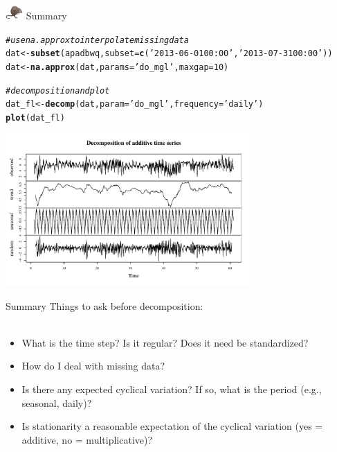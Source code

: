 \documentclass[xcolor=dvipsnames,serif]{beamer}\usepackage[]{graphicx}\usepackage[]{color}
\makeatletter
\newcommand{\hlnum}[1]{\textcolor[rgb]{0.686,0.059,0.569}{#1}}%
\newcommand{\hlstr}[1]{\textcolor[rgb]{0.192,0.494,0.8}{#1}}%
\newcommand{\hlcom}[1]{\textcolor[rgb]{0.678,0.584,0.686}{\textit{#1}}}%
\newcommand{\hlstd}[1]{\textcolor[rgb]{0.345,0.345,0.345}{#1}}%
\newcommand{\hlkwb}[1]{\textcolor[rgb]{0.69,0.353,0.396}{#1}}%
\newcommand{\hlkwc}[1]{\textcolor[rgb]{0.333,0.667,0.333}{#1}}%
\newcommand{\hlkwd}[1]{\textcolor[rgb]{0.737,0.353,0.396}{\textbf{#1}}}%
\newenvironment{kframe}{%
 \def\at@end@of@kframe{}%
 \ifinner\ifhmode%
  \def\at@end@of@kframe{\end{minipage}}%
  \begin{minipage}{\columnwidth}%
 \fi\fi%
 \def\FrameCommand##1{\hskip\@totalleftmargin \hskip-\fboxsep
 \colorbox{shadecolor}{##1}\hskip-\fboxsep
     \hskip-\linewidth \hskip-\@totalleftmargin \hskip\columnwidth}%
 \MakeFramed {\advance\hsize-\width
   \@totalleftmargin\z@ \linewidth\hsize
   \@setminipage}}%
 {\par\unskip\endMakeFramed%
 \at@end@of@kframe}
\newenvironment{knitrout}{}{} %
\makeatother
\begin{document}
\begin{frame}[fragile]{\includegraphics[width = 0.05\textwidth]{imgs/swmprat.png} Summary}{}
\begin{knitrout}\scriptsize
{}\color{fgcolor}\begin{kframe}
\begin{alltt}
\hlcom{# use na.approx to interpolate missing data}
\hlstd{dat} \hlkwb{<-} \hlkwd{subset}\hlstd{(apadbwq,} \hlkwc{subset} \hlstd{=} \hlkwd{c}\hlstd{(}\hlstr{'2013-06-01 00:00'}\hlstd{,} \hlstr{'2013-07-31 00:00'}\hlstd{))}
\hlstd{dat} \hlkwb{<-} \hlkwd{na.approx}\hlstd{(dat,} \hlkwc{params} \hlstd{=} \hlstr{'do_mgl'}\hlstd{,} \hlkwc{maxgap} \hlstd{=} \hlnum{10}\hlstd{)}

\hlcom{# decomposition and plot}
\hlstd{dat_fl} \hlkwb{<-} \hlkwd{decomp}\hlstd{(dat,} \hlkwc{param} \hlstd{=} \hlstr{'do_mgl'}\hlstd{,} \hlkwc{frequency} \hlstd{=} \hlstr{'daily'}\hlstd{)}
\hlkwd{plot}\hlstd{(dat_fl)}
\end{alltt}
\end{kframe}

{\centering \includegraphics[width=0.7\textwidth]{imgs/dailyfl-1} 

}



\end{knitrout}
\end{frame}

\begin{frame}{Summary}{}
Things to ask before decomposition: \\~\\
\begin{itemize}
\item<1-> What is the time step? Is it regular? Does it need be standardized?
\item<2-> How do I deal with missing data?
\item<3-> Is there any expected cyclical variation? If so, what is the period (e.g., seasonal, daily)?
\item<4-> Is stationarity a reasonable expectation of the cyclical variation (yes = additive, no = multiplicative)?
\end{itemize}
\end{frame}
\end{document}

